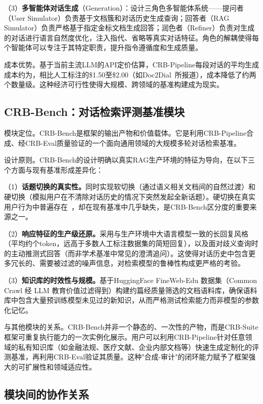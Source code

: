 （3）\textbf{多智能体对话生成}（Generation）：设计三角色多智能体系统——提问者（User Simulator）负责基于文档簇和对话历史生成查询；回答者（RAG Simulator）负责严格基于指定金标文档生成回答；润色者（Refiner）负责对生成的对话进行语言自然度优化，注入指代、省略等真实对话特征。角色的解耦使得每个智能体可以专注于其特定职责，提升指令遵循度和生成质量。


成本优势。基于当前主流LLM的API定价估算，CRB-Pipeline每段对话的平均生成成本约为，相比人工标注的\$1.50至\$2.00（如Doc2Dial~\citep{feng-etal-2020-doc2dial}所报道），成本降低了约两个数量级。这种经济可行性使得大规模、跨领域的基准构建成为现实。

\subsection{CRB-Bench：对话检索评测基准模块}

模块定位。CRB-Bench是框架的输出产物和价值载体。它是利用CRB-Pipeline合成、经CRB-Eval质量验证的一个面向通用领域的大规模多轮对话检索基准。

设计原则。CRB-Bench的设计明确以真实RAG生产环境的特征为导向，在以下三个方面与现有基准形成差异化：

（1）\textbf{话题切换的真实性。}同时实现软切换（通过语义相关文档间的自然过渡）和硬切换（模拟用户在不清除对话历史的情况下突然发起全新话题）。硬切换在真实用户行为中普遍存在~\citep{spink2002multitasking}，却在现有基准中几乎缺失，是CRB-Bench区分度的重要来源之一。
    
（2）\textbf{响应特征的生产级还原。}采用与生产环境中大语言模型一致的长回复风格（平均约个token，远高于多数人工标注数据集的简短回复），以及面对歧义查询时的主动推测式回答（而非学术基准中常见的澄清追问）。这使得对话历史中包含更多冗长的、需要被过滤的噪声信息，对检索模型的鲁棒性构成更严格的考验。
    
（3）\textbf{知识库的时效性与规模。}基于HuggingFace FineWeb-Edu 数据集（Common Crawl 经 LLM 教育价值过滤得到）构建约篇经质量筛选的文档语料库，确保语料库中包含大量预训练模型未见过的新知识，从而严格测试检索能力而非模型的参数化记忆。


与其他模块的关系。CRB-Bench并非一个静态的、一次性的产物，而是CRB-Suite框架可重复执行能力的一次实例化展示。用户可以利用CRB-Pipeline针对任意领域的私有知识库（如金融法规、医疗文献、企业内部文档等）快速生成定制化的评测基准，再利用CRB-Eval验证其质量。这种"合成-审计"的闭环能力赋予了框架强大的可扩展性和领域适应性。

\subsection{模块间的协作关系}

